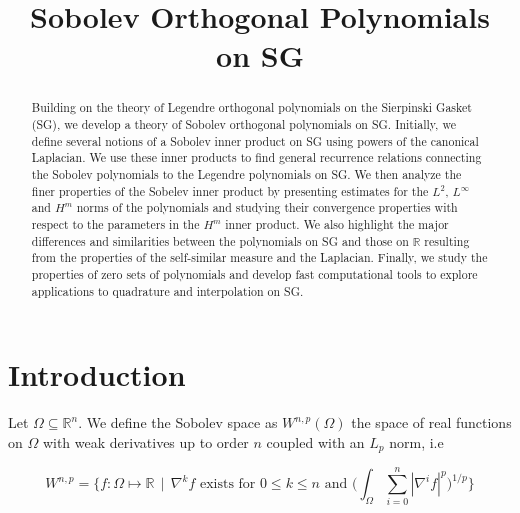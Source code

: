 \documentclass[12pt]{amsart}
\theoremstyle{plain}
\theoremstyle{definition}
\newcommand{\RR}{\mathbb{R}}
\begin{document}
\title{Sobolev Orthogonal Polynomials on SG}%
\author{} %
 
\maketitle
\begin{abstract}

Building on the theory of Legendre orthogonal polynomials on the Sierpinski Gasket (SG), we develop a theory of Sobolev orthogonal polynomials on SG. Initially, we define several notions of a Sobolev inner product on SG using powers of the canonical Laplacian. We use these inner products to find general recurrence relations connecting the Sobolev polynomials to the Legendre polynomials on SG. We then analyze the finer properties of the Sobelev inner product by presenting estimates for the $L^2$, $L^\infty$ and $H^m$ norms of the polynomials and studying their convergence properties with respect to the parameters in the $H^m$ inner product. We also highlight the major differences and similarities between the polynomials on SG and those on $\mathbb{R}$ resulting from the properties of the self-similar measure and the Laplacian. Finally, we study the properties of zero sets of polynomials and develop fast computational tools to explore applications to quadrature and interpolation on SG. 

\end{abstract}

\section{Introduction}
Let $\Omega \subseteq \RR^n$. We define the Sobolev space as $W^{n,p}(\Omega)$ the space of real functions on $\Omega$ with weak derivatives up to order $n$ coupled with an $L_p$ norm, i.e 

$$ W^{n,p} = \{f: \Omega \mapsto \RR \,\mid \, \nabla^{k}f \text{ exists for } 0 \leq k \leq n \text{ and } \Big(\int_{\Omega}\sum_{i=0}^{n} |\nabla^{i}f|^p \Big)^{1/p}\} $$
\end{document}
